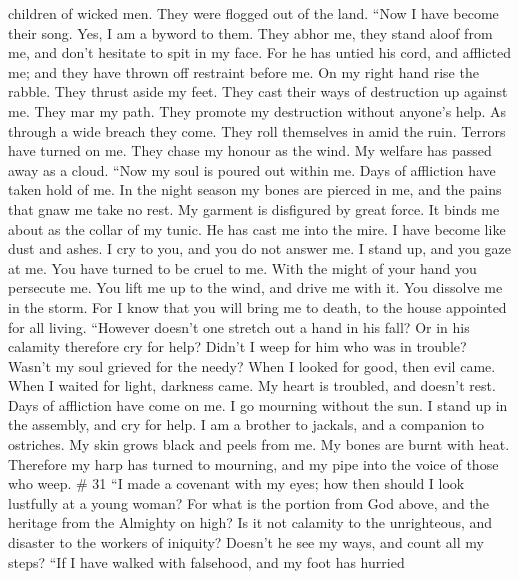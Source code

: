 children of wicked men. They were flogged out of the land. 
``Now I have become their song. Yes, I am a byword to them.
 They abhor me, they stand aloof from me, and don't
hesitate to spit in my face.  For he has untied his cord,
and afflicted me; and they have thrown off restraint before me.
 On my right hand rise the rabble. They thrust aside my
feet. They cast their ways of destruction up against me. 
They mar my path. They promote my destruction without anyone's help.
 As through a wide breach they come. They roll themselves
in amid the ruin.  Terrors have turned on me. They chase my
honour as the wind. My welfare has passed away as a cloud. 
``Now my soul is poured out within me. Days of affliction have taken
hold of me.  In the night season my bones are pierced in
me, and the pains that gnaw me take no rest.  My garment is
disfigured by great force. It binds me about as the collar of my tunic.
 He has cast me into the mire. I have become like dust and
ashes.  I cry to you, and you do not answer me. I stand up,
and you gaze at me.  You have turned to be cruel to me.
With the might of your hand you persecute me.  You lift me
up to the wind, and drive me with it. You dissolve me in the storm.
 For I know that you will bring me to death, to the house
appointed for all living.  ``However doesn't one stretch
out a hand in his fall? Or in his calamity therefore cry for help?
 Didn't I weep for him who was in trouble? Wasn't my soul
grieved for the needy?  When I looked for good, then evil
came. When I waited for light, darkness came.  My heart is
troubled, and doesn't rest. Days of affliction have come on me.
 I go mourning without the sun. I stand up in the assembly,
and cry for help.  I am a brother to jackals, and a
companion to ostriches.  My skin grows black and peels from
me. My bones are burnt with heat.  Therefore my harp has
turned to mourning, and my pipe into the voice of those who weep. \# 31
 ``I made a covenant with my eyes; how then should I look
lustfully at a young woman?  For what is the portion from
God above, and the heritage from the Almighty on high?  Is
it not calamity to the unrighteous, and disaster to the workers of
iniquity?  Doesn't he see my ways, and count all my steps?
 ``If I have walked with falsehood, and my foot has hurried
